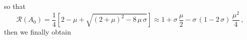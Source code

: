 so that
\begin{equation}
    \mathcal{R}(A_0) = \frac{1}{4}\left[ 2 - \mu + \sqrt{(2 + \mu)^2 - 8\, \mu\, \sigma} \right] \approx 1 + \sigma\, \frac{\mu}{2} - \sigma\, (1 - 2\, \sigma)\, \frac{\mu^2}{4}\, ,
\end{equation}
then we finally obtain
